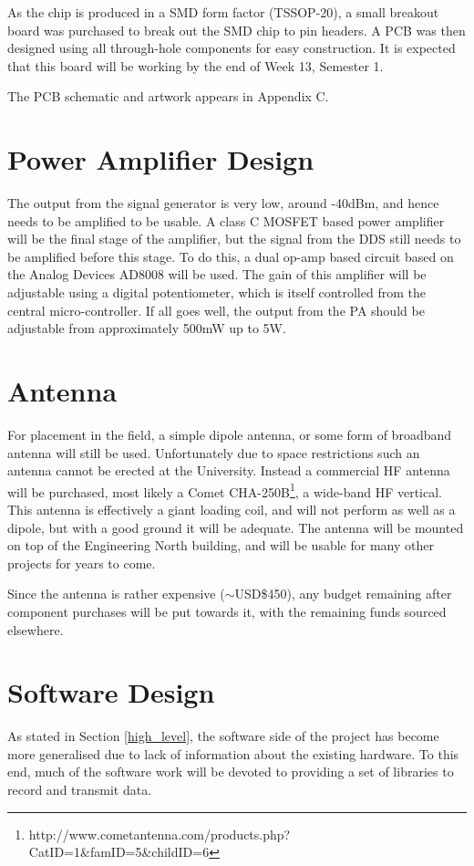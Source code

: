 \documentclass[a4paper,12pt]{article}
\begin{document}
As the chip is produced in a SMD form factor (TSSOP-20), a small breakout board was purchased to break out the SMD chip to pin headers. A PCB was then designed using all through-hole components for easy construction. It is expected that this board will be working by the end of Week 13, Semester 1.

The PCB schematic and artwork appears in Appendix C.

\section{Power Amplifier Design}
The output from the signal generator is very low, around -40dBm, and hence needs to be amplified to be usable. A class C MOSFET based power amplifier will be the final stage of the amplifier, but the signal from the DDS still needs to be amplified before this stage. To do this, a dual op-amp based circuit based on the Analog Devices AD8008 will be used. The gain of this amplifier will be adjustable using a digital potentiometer, which is itself controlled from the central micro-controller. If all goes well, the output from the PA should be adjustable from approximately 500mW up to 5W.

\section{Antenna}
For placement in the field, a simple dipole antenna, or some form of broadband antenna will still be used. Unfortunately due to space restrictions such an antenna cannot be erected at the University. Instead a commercial HF antenna will be purchased, most likely a Comet CHA-250B\footnote{http://www.cometantenna.com/products.php?CatID=1\&famID=5\&childID=6}, a wide-band HF vertical. This antenna is effectively a giant loading coil, and will not perform as well as a dipole, but with a good ground it will be adequate. The antenna will be mounted on top of the Engineering North building, and will be usable for many other projects for years to come.

Since the antenna is rather expensive ($\sim$USD\$450), any budget remaining after component purchases will be put towards it, with the remaining funds sourced elsewhere.

\section{Software Design}
As stated in Section \ref{high_level}, the software side of the project has become more generalised due to lack of information about the existing hardware. To this end, much of the software work will be devoted to providing a set of libraries to record and transmit data.
\end{document}

